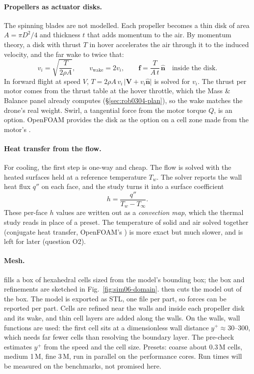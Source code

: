 \paragraph{Propellers as actuator disks.} The spinning blades are not modelled. Each propeller becomes a thin
disk of area $A=\pi D^2/4$ and thickness $t$ that adds momentum to the air. By momentum theory, a disk with
thrust $T$ in hover accelerates the air through it to the induced velocity, and the far wake to twice that:
\[
  v_i=\sqrt{\frac{T}{2\rho A}},\qquad v_{\text{wake}}=2v_i,\qquad
  \mathbf f=\frac{T}{A\,t}\,\hat{\mathbf n}\quad\text{inside the disk.}
\]
In forward flight at speed $V$, $T=2\rho A\,v_i\,\lvert\mathbf V+v_i\hat{\mathbf n}\rvert$ is solved for $v_i$.
The thrust per motor comes from the  thrust table at the hover throttle, which the
Mass \& Balance panel already computes (\S\ref{sec:rob0304-plan}), so the wake matches the drone's real
weight. Swirl, a tangential force from the motor torque $Q$, is an option. OpenFOAM provides the disk as the
 option on a cell zone made from the motor's .

\paragraph{Heat transfer from the flow.} For cooling, the first step is one-way and cheap. The flow is solved
with the heated surfaces held at a reference temperature $T_w$. The solver reports the wall heat flux $q''$
on each face, and the study turns it into a surface coefficient
\[
  h=\frac{q''}{T_w-T_\infty}.
\]
These per-face $h$ values are written out as a \emph{convection map}, which the thermal study reads in place
of a preset. The temperature of solid and air solved together (conjugate heat transfer, OpenFOAM's
) is more exact but much slower, and is left for later (question O2).

\paragraph{Mesh.}  fills a box of hexahedral cells sized from the model's bounding box; the
box and refinements are sketched in Fig.~\ref{fig:sim06-domain}.  then cuts the model out
of the box. The model is exported as STL, one file per part, so forces can be reported per part. Cells are
refined near the walls and inside each propeller disk and its wake, and thin cell layers are added along the
walls. On the walls, wall functions are used: the first cell sits at a dimensionless wall distance
$y^+\approx30$--$300$, which needs far fewer cells than resolving the boundary layer. The pre-check estimates
$y^+$ from the speed and the cell size. Presets: coarse about 0.3\,M cells, medium 1\,M, fine 3\,M, run in
parallel on the performance cores. Run times will be measured on the benchmarks, not promised here.

